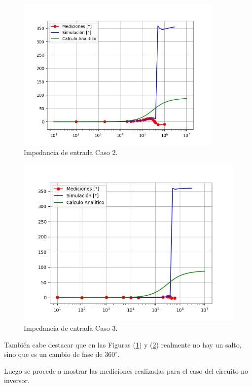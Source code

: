 \begin{figure}[H]	
	\centering
	\includegraphics[width=0.9\textwidth]{Ejercicio1/Imagenes/ZinphC2.png}
	\caption{Impedancia de entrada Caso 2.}
	\label{fig:CompZinphC2}
\end{figure} 
\begin{figure}[H]	
	\centering
	\includegraphics[width=\textwidth]{Ejercicio1/Imagenes/ZinphC3.png}
	\caption{Impedancia de entrada Caso 3.}
	\label{fig:CompZinphC3}
\end{figure}

También cabe destacar que en las Figuras (\ref{fig:CompZinphC2}) y (\ref{fig:CompZinphC3}) realmente no hay un salto, sino que es un cambio de fase de $360^{\circ}$.

Luego se procede a mostrar las mediciones realizadas para el caso del circuito no inversor.

